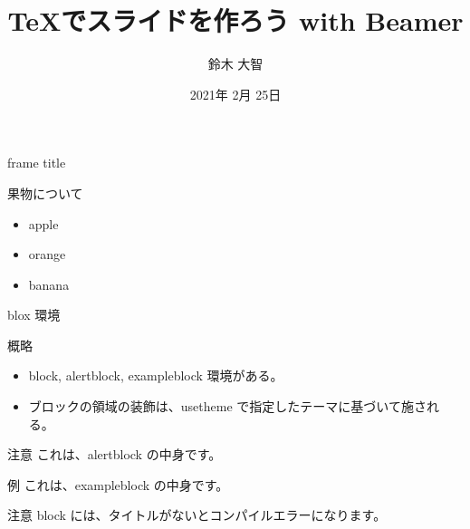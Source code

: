 \documentclass[dvipdfmx]{beamer}  %
\title[Beamer Tutorial]{\TeX でスライドを作ろう with Beamer}
\author[sudachi]{鈴木 大智}
\date[2021/02/25]{2021年 2月 25日}
\institute[日本大学大学院]{日本大学大学院 理工学研究科 数学専攻}
\begin{document}
\frame{\maketitle}



\begin{frame}{frame title}

  果物について
  
  \begin{itemize}
    \item apple
    \item orange
    \item banana
  \end{itemize}
\end{frame}

\begin{frame}{blox 環境}

  \begin{block}{概略}
    \begin{itemize}
      \item block, alertblock, exampleblock 環境がある。
      \item ブロックの領域の装飾は、usetheme で指定したテーマに基づいて施される。
    \end{itemize}
  \end{block}

  \begin{alertblock}{注意}
    これは、alertblock の中身です。
  \end{alertblock}

  \begin{exampleblock}{例}
    これは、exampleblock の中身です。
  \end{exampleblock}

  \begin{alertblock}{注意}
    block には、タイトルがないとコンパイルエラーになります。
  \end{alertblock}

\end{frame}
\end{document}
